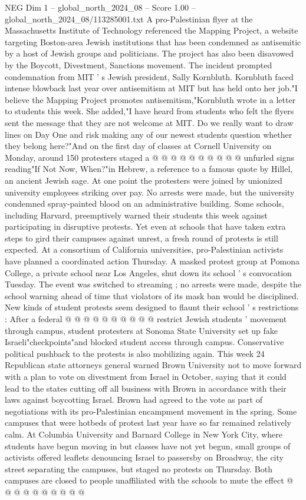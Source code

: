 \begin{textsample}{NEG Dim 1 – global\_north\_2024\_08 – Score 1.00 – global\_north\_2024\_08/113285001.txt}
A pro-Palestinian flyer at the Massachusetts Institute of Technology referenced the Mapping Project, a website targeting Boston-area Jewish institutions that has been condemned as antisemitic by a host of Jewish groups and politicians.
The project has also been disavowed by the Boycott, Divestment, Sanctions movement.
The incident prompted condemnation from MIT ' s Jewish president, Sally Kornbluth.
Kornbluth faced intense blowback last year over antisemitism at MIT but has held onto her job."I believe the Mapping Project promotes antisemitism,"Kornbluth wrote in a letter to students this week.
She added,"I have heard from students who felt the flyers sent the message that they are not welcome at MIT.
Do we really want to draw lines on Day One and risk making any of our newest students question whether they belong here?"And on the first day of classes at Cornell University on Monday, around 150 protesters staged a @ @ @ @ @ @ @ @ @ @ unfurled signs reading"If Not Now, When?"in Hebrew, a reference to a famous quote by Hillel, an ancient Jewish sage.
At one point the protesters were joined by unionized university employees striking over pay.
No arrests were made, but the university condemned spray-painted blood on an administrative building.
Some schools, including Harvard, preemptively warned their students this week against participating in disruptive protests.
Yet even at schools that have taken extra steps to gird their campuses against unrest, a fresh round of protests is still expected.
At a consortium of California universities, pro-Palestinian activists have planned a coordinated action Thursday.
A masked protest group at Pomona College, a private school near Los Angeles, shut down its school ' s convocation Tuesday.
The event was switched to streaming ; no arrests were made, despite the school warning ahead of time that violators of its mask ban would be disciplined.
New kinds of student protests seem designed to flaunt their school ' s restrictions : After a federal @ @ @ @ @ @ @ @ @ @ restrict Jewish students ' movement through campus, student protesters at Sonoma State University set up fake Israeli"checkpoints"and blocked student access through campus.
Conservative political pushback to the protests is also mobilizing again.
This week 24 Republican state attorneys general warned Brown University not to move forward with a plan to vote on divestment from Israel in October, saying that it could lead to the states cutting off all business with Brown in accordance with their laws against boycotting Israel.
Brown had agreed to the vote as part of negotiations with its pro-Palestinian encampment movement in the spring.
Some campuses that were hotbeds of protest last year have so far remained relatively calm.
At Columbia University and Barnard College in New York City, where students have begun moving in but classes have not yet begun, small groups of activists offered leaflets denouncing Israel to passersby on Broadway, the city street separating the campuses, but staged no protests on Thursday.
Both campuses are closed to people unaffiliated with the schools to mute the effect @ @ @ @ @ @ @ @ @ @

\end{textsample}
